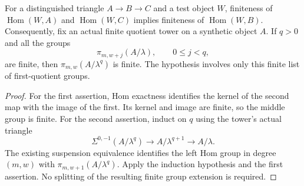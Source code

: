 \begin{lemma}
  \label{lem:synthetic-finite-quotient-homotopy}
  \leanok
  For a distinguished triangle $A\to B\to C$ and a test object $W$,
  finiteness of $\operatorname{Hom}(W,A)$ and $\operatorname{Hom}(W,C)$
  implies finiteness of $\operatorname{Hom}(W,B)$.
  Consequently, fix an actual finite quotient tower on a synthetic object
  $A$.  If $q>0$ and all the groups
  \[
    \pi_{m,w+j}(A/\lambda),\qquad 0\le j<q,
  \]
  are finite, then $\pi_{m,w}(A/\lambda^q)$ is finite.
  The hypothesis involves only this finite list of first-quotient groups.
\end{lemma}
\begin{proof}
  \leanok
  For the first assertion, Hom exactness identifies the kernel of the
  second map with the image of the first.  Its kernel and image are finite,
  so the middle group is finite.  For the second assertion, induct on $q$
  using the tower's actual triangle
  \[
    \Sigma^{0,-1}(A/\lambda^q)\longrightarrow A/\lambda^{q+1}
      \longrightarrow A/\lambda.
  \]
  The existing suspension equivalence identifies the left Hom group in
  degree $(m,w)$ with $\pi_{m,w+1}(A/\lambda^q)$.  Apply the induction
  hypothesis and the first assertion.  No splitting of the resulting
  finite group extension is required.
\end{proof}

